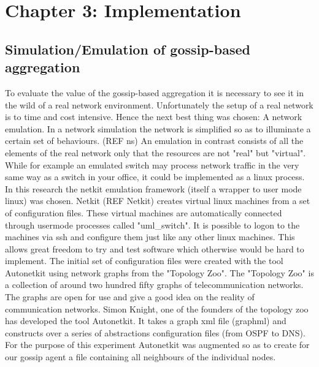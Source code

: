 \documentclass[11pt,a4paper]{article}
\begin{document}
\newpage

\section{Chapter 3: Implementation}
\subsection{Simulation/Emulation of gossip-based aggregation}
To evaluate the value of the gossip-based aggregation it is necessary to see it in the wild of a real network environment. Unfortunately the setup of a real network is to time and cost intensive. Hence the next best thing was chosen: A network emulation. In a network simulation the network is simplified so as to illuminate a certain set of behaviours. (REF ns) An emulation in contrast consists of all the elements of the real network only that the resources are not "real" but "virtual". While for example an emulated switch may process network traffic in the very same way as a switch in your office, it could be implemented as a linux process.
In this research the netkit emulation framework (itself a wrapper to user mode linux) was chosen. Netkit (REF Netkit) creates virtual linux machines from a set of configuration files. These virtual machines are automatically connected through usermode processes called "uml\_switch". It is possible to logon to the machines via ssh and configure them just like any other linux machines. This allows great freedom to try and test software which otherwise would be hard to implement.
The initial set of configuration files were created with the tool Autonetkit using network graphs from the "Topology Zoo". The "Topology Zoo" is a collection of around two hundred fifty graphs of telecommunication networks. The graphs are open for use and give a good idea on the reality of communication networks. Simon Knight, one of the founders of the topology zoo has developed the tool Autonetkit. It takes a graph xml file (graphml) and constructs over a series of abstractions configuration files (from OSPF to DNS). For the purpose of this experiment Autonetkit was augmented so as to create for our gossip agent a file containing all neighbours of the individual nodes.
\end{document}
